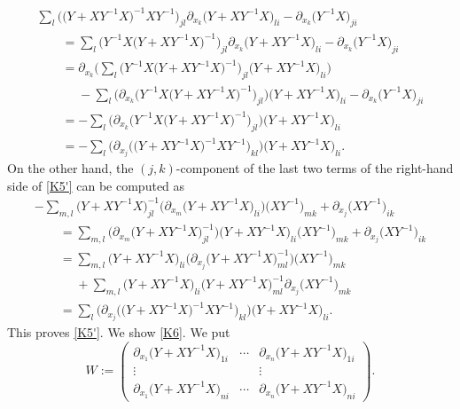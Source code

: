 \documentclass[10pt,a4paper]{amsart}
\numberwithin{equation}{section}
\begin{document}
\begin{gather*}
 \sum_{l}\bigl(\bigl(Y+XY^{-1}X\bigr)^{-1}XY^{-1}\bigr)_{jl}\partial_{x_k}\bigl(Y+XY^{-1}X\bigr)_{li}-\partial_{x_k}\bigl(Y^{-1}X\bigr)_{ji}\\
\qquad= \sum_{l}\bigl(Y^{-1}X\bigl(Y+XY^{-1}X\bigr)^{-1}\bigr)_{jl}\partial_{x_k}\bigl(Y+XY^{-1}X\bigr)_{li}-\partial_{x_k}\bigl(Y^{-1}X\bigr)_{ji} \\
\qquad= \partial_{x_k} \Big(\sum_{l}\bigl(Y^{-1}X\bigl(Y+XY^{-1}X\bigr)^{-1}\bigr)_{jl}\bigl(Y+XY^{-1}X\bigr)_{li}\Big)\\
\qquad\phantom{=}{} -\sum_{l}\bigl(\partial_{x_k} \bigl(Y^{-1}X\bigl(Y+XY^{-1}X\bigr)^{-1}\bigr)_{jl}\bigr)\bigl(Y+XY^{-1}X\bigr)_{li}-\partial_{x_k}\bigl(Y^{-1}X\bigr)_{ji} \\
\qquad= -\sum_{l}\bigl(\partial_{x_k} \bigl(Y^{-1}X\bigl(Y+XY^{-1}X\bigr)^{-1}\bigr)_{jl}\bigr)\bigl(Y+XY^{-1}X\bigr)_{li}\\
\qquad= -\sum_{l}\bigl(\partial_{x_j} \bigl(\bigl(Y+XY^{-1}X\bigr)^{-1}XY^{-1}\bigr)_{kl}\bigr)\bigl(Y+XY^{-1}X\bigr)_{li}.
\end{gather*}
On the other hand, the $(j, k)$-component of the last two terms of the right-hand side of \eqref{K5'} can be computed as
\begin{gather*}
-\sum_{m, l} \bigl(Y+XY^{-1}X\bigr)^{-1}_{jl}\bigl(\partial_{x_m}\bigl(Y+XY^{-1}X\bigr)_{li}\bigr)\bigl(XY^{-1}\bigr)_{mk}+\partial_{x_j}\bigl(XY^{-1}\bigr)_{ik}\\
\qquad=\sum_{m, l} \bigl(\partial_{x_m}\bigl(Y+XY^{-1}X\bigr)^{-1}_{jl}\bigr)\bigl(Y+XY^{-1}X\bigr)_{li}\bigl(XY^{-1}\bigr)_{mk}+\partial_{x_j}\bigl(XY^{-1}\bigr)_{ik}\\
\qquad=\sum_{m, l}\bigl(Y+XY^{-1}X\bigr)_{li}\bigl(\partial_{x_j}\bigl(Y+XY^{-1}X\bigr)^{-1}_{ml}\bigr) \bigl(XY^{-1}\bigr)_{mk}\\
\qquad\phantom{=}{} +\sum_{m, l}\bigl(Y+XY^{-1}X\bigr)_{li}\bigl(Y+XY^{-1}X\bigr)^{-1}_{ml}\partial_{x_j}\bigl(XY^{-1}\bigr)_{mk}
\\
\qquad=\sum_{l}\bigl(\partial_{x_j}\bigl(\bigl(Y+XY^{-1}X\bigr)^{-1}XY^{-1}\bigr)_{kl}\bigr) \bigl(Y+XY^{-1}X\bigr)_{li}.
\end{gather*}
This proves \eqref{K5'}. We show \eqref{K6}. We put
\[
W:=
\begin{pmatrix}
\partial_{x_1}\bigl(Y+XY^{-1}X\bigr)_{1i} & \cdots & \partial_{x_n}\bigl(Y+XY^{-1}X\bigr)_{1i} \\
\vdots & & \vdots \\
\partial_{x_1}\bigl(Y+XY^{-1}X\bigr)_{ni} & \cdots & \partial_{x_n}\bigl(Y+XY^{-1}X\bigr)_{ni}
\end{pmatrix}.
\]
\end{document}
